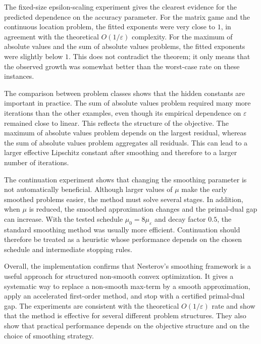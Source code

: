\documentclass[11pt]{article}
\begin{document}
The fixed-size epsilon-scaling experiment gives the clearest evidence for the
predicted dependence on the accuracy parameter. For the matrix game and the
continuous location problem, the fitted exponents were very close to \(1\), in
agreement with the theoretical \(O(1/\varepsilon)\) complexity. For the maximum
of absolute values and the sum of absolute values problems, the fitted
exponents were slightly below \(1\). This does not contradict the theorem; it
only means that the observed growth was somewhat better than the worst-case rate
on these instances.

The comparison between problem classes shows that the hidden constants are
important in practice. The sum of absolute values problem required many more
iterations than the other examples, even though its empirical dependence on
\(\varepsilon\) remained close to linear. This reflects the structure of the
objective. The maximum of absolute values problem depends on the largest
residual, whereas the sum of absolute values problem aggregates all residuals.
This can lead to a larger effective Lipschitz constant after smoothing and
therefore to a larger number of iterations.

The continuation experiment shows that changing the smoothing parameter is not
automatically beneficial. Although larger values of \(\mu\) make the early
smoothed problems easier, the method must solve several stages. In addition,
when \(\mu\) is reduced, the smoothed approximation changes and the
primal-dual gap can increase. With the tested schedule
\(\mu_0=8\mu_\varepsilon\) and decay factor \(0.5\), the standard smoothing
method was usually more efficient. Continuation should therefore be treated as
a heuristic whose performance depends on the chosen schedule and intermediate
stopping rules.

Overall, the implementation confirms that Nesterov's smoothing framework is a
useful approach for structured non-smooth convex optimization. It gives a
systematic way to replace a non-smooth max-term by a smooth approximation, apply
an accelerated first-order method, and stop with a certified primal-dual gap.
The experiments are consistent with the theoretical \(O(1/\varepsilon)\) rate
and show that the method is effective for several different problem structures.
They also show that practical performance depends on the objective structure and
on the choice of smoothing strategy.



\end{document}
